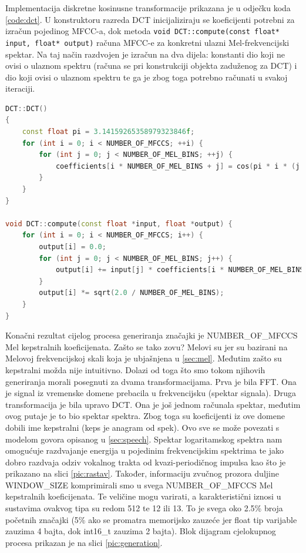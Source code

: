 Implementacija  diskretne kosinusne transformacije prikazana je u odječku koda \ref{code:dct}.
U konstruktoru razreda DCT inicijaliziraju se koeficijenti potrebni za izračun pojedinog MFCC-a,
dok metoda \texttt{void DCT::compute(const float* input, float* output)} 
računa MFCC-e za konkretni ulazni Mel-frekvencijski spektar. Na taj način
razdvojen je izračun na dva dijela: konstanti dio koji ne ovisi o ulaznom spektru (računa
se pri konstrukciji objekta zaduženog za DCT) i dio koji
ovisi o ulaznom spektru te ga je zbog toga potrebno računati u svakoj iteraciji.\newline{}


\begin{lstlisting}[language=C++, caption=FFT, label=code:dct]
DCT::DCT()
{
    const float pi = 3.14159265358979323846f;
    for (int i = 0; i < NUMBER_OF_MFCCS; ++i) {
        for (int j = 0; j < NUMBER_OF_MEL_BINS; ++j) {
            coefficients[i * NUMBER_OF_MEL_BINS + j] = cos(pi * i * (j + 0.5f) / NUMBER_OF_MEL_BINS);
        }
    }
}

void DCT::compute(const float *input, float *output) {
    for (int i = 0; i < NUMBER_OF_MFCCS; i++) {
        output[i] = 0.0;
        for (int j = 0; j < NUMBER_OF_MEL_BINS; j++) {
            output[i] += input[j] * coefficients[i * NUMBER_OF_MEL_BINS + j];
        }
        output[i] *= sqrt(2.0 / NUMBER_OF_MEL_BINS);
    }
}
\end{lstlisting}

Konačni rezultat cijelog procesa generiranja značajki je NUMBER\_OF\_MFCCS Mel kepstralnih
koeficijenata. Zašto se tako zovu? Melovi su jer su bazirani na Melovoj frekvencijskoj
skali koja je ubjašnjena u \ref{sec:mel}. Međutim zašto su kepstralni možda nije intuitivno.
Dolazi od toga što smo tokom njihovih generiranja morali posegnuti za dvama transformacijama.
Prva je bila FFT. Ona je signal iz vremenske domene prebacila u frekvencijsku (spektar
signala). Druga transformacija je bila upravo DCT. Ona je još jednom računala spektar, međutim
ovog putaje je to bio spektar spektra. Zbog toga su koeficijenti iz ove domene dobili ime
kepstralni (keps je anagram od spek). Ovo sve se može povezati s modelom govora opisanog
u \ref{sec:speech}. Spektar logaritamskog spektra nam omogućuje razdvajanje energija u pojedinim 
frekvencijskim spektrima te jako dobro razdvaja odziv vokalnog trakta od kvazi-periodičnog
impulsa kao što je prikazano na slici \ref{pic:rastav}. Također, informaciju zvučnog prozora duljine WINDOW\_SIZE komprimirali smo
u svega NUMBER\_OF\_MFCCS Mel kepstralnih koeficijenata. Te veličine mogu varirati, a
karakteristični iznosi u sustavima ovakvog tipa su redom 512 te 12 ili 13. To je svega oko 2.5\% 
broja početnih značajki (5\% ako se promatra memorijsko zauzeće jer float tip varijable
zauzima 4 bajta, dok int16\_t zauzima 2 bajta). Blok dijagram cjelokupnog procesa prikazan
je na slici \ref{pic:generation}.

